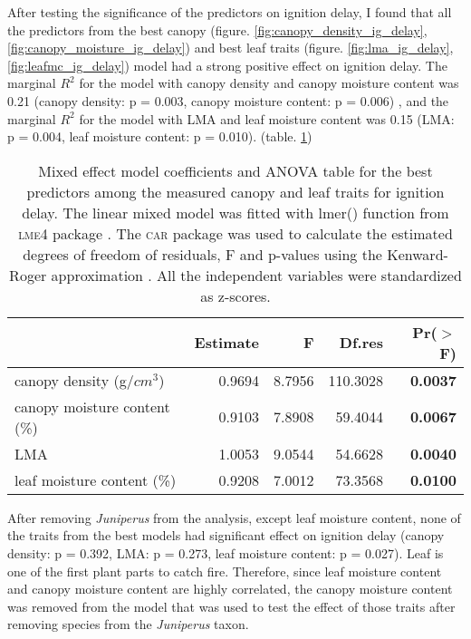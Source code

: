 \documentclass{ttuthes2007}
\newcommand{\pkg}[1]{\textsc{#1}}
\begin{document}


After testing the significance of the predictors on ignition delay, I found that all the predictors from the best canopy (figure. \ref{fig:canopy_density_ig_delay}, \ref{fig:canopy_moisture_ig_delay}) and best leaf traits (figure. \ref{fig:lma_ig_delay}, \ref{fig:leafmc_ig_delay}) model had a strong positive effect on ignition delay. The marginal $R^2$ for the model with canopy density and canopy moisture content was 0.21 (canopy density: p = 0.003, canopy moisture content: p = 0.006) , and the marginal $R^2$ for the model with LMA and leaf moisture content was 0.15 (LMA: p = 0.004, leaf moisture content: p = 0.010). (table. \ref{tab:fandpforig_delay})

\begin{table}[ht]
  \centering
  \caption{Mixed effect model coefficients and ANOVA table for the best
    predictors among the measured canopy and leaf traits for ignition delay.
    The linear mixed model was fitted with lmer() function from \pkg{lme4}
    package \citep{bates2009package}. The \pkg{car} package
    \citep{fox2013hypothesis} was used to calculate the estimated degrees of
    freedom of residuals, F and p-values using the Kenward-Roger approximation
    \citep{kenward1997small}. All the independent variables were standardized
    as z-scores.}
  \begin{tabular}{lrrrr}
    \toprule
    & Estimate & F & Df.res & Pr($>$F) \\ 
    \midrule
    canopy density (g/{$cm^3$}) & 0.9694 & 8.7956  & 110.3028 & \textbf{0.0037} \\ 
    canopy moisture content (\%) & 0.9103 & 7.8908 & 59.4044 & \textbf{0.0067} \\ 
    LMA & 1.0053 & 9.0544  & 54.6628 & \textbf{0.0040} \\  
    leaf moisture content (\%) & 0.9208 & 7.0012  & 73.3568 & \textbf{0.0100} \\ 
    \bottomrule
  \end{tabular}
  \label{tab:fandpforig_delay}
\end{table}

After removing \emph{Juniperus} from the analysis, except leaf moisture content, none of the traits from the best models had significant effect on ignition delay (canopy density: p = 0.392,
LMA: p = 0.273, leaf moisture content: p = 0.027). Leaf is one of the first plant parts to catch fire.
Therefore, since leaf moisture content and canopy moisture content are highly correlated, the canopy moisture content was removed from the model that was used to test the effect of those traits after removing species from the \emph{Juniperus} taxon.
\end{document}
